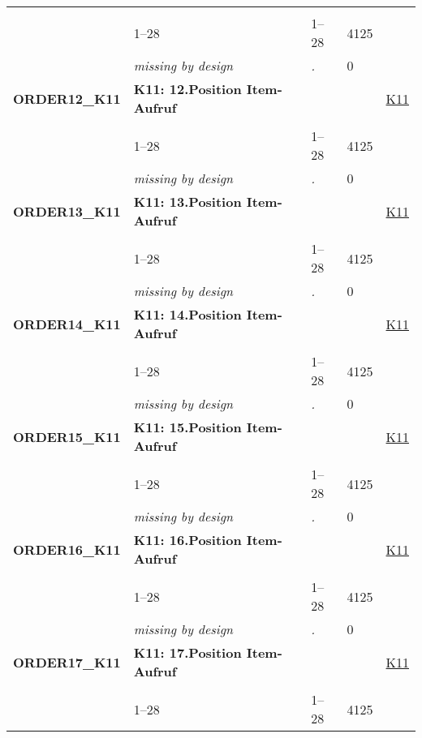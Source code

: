 \begin{longtable}{| L{2.65cm} | L{8cm} | C{1.5cm} | R{1.25cm} | C{2.25cm}  |}
   &  &  &  &  \\ 
   & 1--28 & 1--28 & 4125 &  \\ 
   & \textit{missing by design} & \textit{.} & 0 &  \\ 
   \midrule
\textbf{ORDER12\_K11}\label{var:ORDER12:K11} & \textbf{K11: 12.Position Item-Aufruf} &  &  & \hyperref[K11]{K11} \\ 
   &  &  &  &  \\ 
   & 1--28 & 1--28 & 4125 &  \\ 
   & \textit{missing by design} & \textit{.} & 0 &  \\ 
   \midrule
\textbf{ORDER13\_K11}\label{var:ORDER13:K11} & \textbf{K11: 13.Position Item-Aufruf} &  &  & \hyperref[K11]{K11} \\ 
   &  &  &  &  \\ 
   & 1--28 & 1--28 & 4125 &  \\ 
   & \textit{missing by design} & \textit{.} & 0 &  \\ 
   \midrule
\textbf{ORDER14\_K11}\label{var:ORDER14:K11} & \textbf{K11: 14.Position Item-Aufruf} &  &  & \hyperref[K11]{K11} \\ 
   &  &  &  &  \\ 
   & 1--28 & 1--28 & 4125 &  \\ 
   & \textit{missing by design} & \textit{.} & 0 &  \\ 
   \midrule
\textbf{ORDER15\_K11}\label{var:ORDER15:K11} & \textbf{K11: 15.Position Item-Aufruf} &  &  & \hyperref[K11]{K11} \\ 
   &  &  &  &  \\ 
   & 1--28 & 1--28 & 4125 &  \\ 
   & \textit{missing by design} & \textit{.} & 0 &  \\ 
   \midrule
\textbf{ORDER16\_K11}\label{var:ORDER16:K11} & \textbf{K11: 16.Position Item-Aufruf} &  &  & \hyperref[K11]{K11} \\ 
   &  &  &  &  \\ 
   & 1--28 & 1--28 & 4125 &  \\ 
   & \textit{missing by design} & \textit{.} & 0 &  \\ 
   \midrule
\textbf{ORDER17\_K11}\label{var:ORDER17:K11} & \textbf{K11: 17.Position Item-Aufruf} &  &  & \hyperref[K11]{K11} \\ 
   &  &  &  &  \\ 
   & 1--28 & 1--28 & 4125 &  \\ 

\end{longtable}
